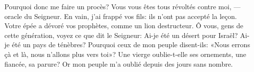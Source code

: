 Pourquoi donc me faire un procès?
	Vous vous êtes tous révoltés contre moi, --- oracle du Seigneur.
En vain, j’ai frappé vos fils: ils n’ont pas accepté la leçon.
Votre épée a dévoré vos prophètes, comme un lion destructeur.
Ô vous, gens de cette génération, voyez ce que dit le Seigneur:
	Ai-je été un désert pour Israël? Ai-je été un pays de ténèbres?
	Pourquoi ceux de mon peuple disent-ils:
	«Nous errons çà et là, nous n’allons plus vers toi»?
Une vierge oublie-t-elle ses ornements, une fiancée, sa parure?
	Or mon peuple m’a oublié depuis des jours sans nombre.
